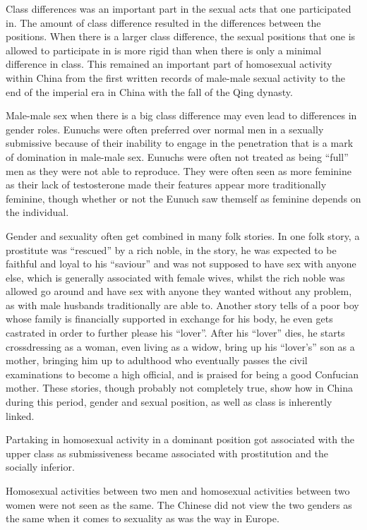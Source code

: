 Class differences was an important part in the sexual acts that one participated in. The amount of class difference resulted in the differences between the positions. When there is a larger class difference, the sexual positions that one is allowed to participate in is more rigid than when there is only a minimal difference in class. This remained an important part of homosexual activity within China from the first written records of male-male sexual activity to the end of the imperial era in China with the fall of the Qing dynasty.

Male-male sex when there is a big class difference may even lead to differences in gender roles. Eunuchs were often preferred over normal men in a sexually submissive because of their inability to engage in the penetration that is a mark of domination in male-male sex. Eunuchs were often not treated as being “full” men as they were not able to reproduce. They were often seen as more feminine as their lack of testosterone made their features appear more traditionally feminine, though whether or not the Eunuch saw themself as feminine depends on the individual.

Gender and sexuality often get combined in many folk stories. In one folk story, a prostitute was “rescued” by a rich noble, in the story, he was expected to be faithful and loyal to his “saviour” and was not supposed to have sex with anyone else, which is generally associated with female wives, whilst the rich noble was allowed go around and have sex with anyone they wanted without any problem, as with male husbands traditionally are able to. Another story tells of a poor boy whose family is financially supported in exchange for his body, he even gets castrated in order to further please his “lover”. After his “lover” dies, he starts crossdressing as a woman, even living as a widow, bring up his “lover's” son as a mother, bringing him up to adulthood who eventually passes the civil examinations to become a high official, and is praised for being a good Confucian mother. These stories, though probably not completely true, show how in China during this period, gender and sexual position, as well as class is inherently linked.

Partaking in homosexual activity in a dominant position got associated with the upper class as submissiveness became associated with prostitution and the socially inferior\Autocite{hinsch1990passions}.

Homosexual activities between two men and homosexual activities between two women were not seen as the same\Autocite{hinsch1990passions}. The Chinese did not view the two genders as the same when it comes to sexuality as was the way in Europe.

